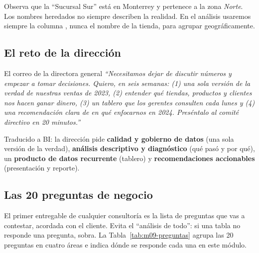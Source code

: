 \begin{advertencia}
Observa que la ``Sucursal Sur'' está en Monterrey y pertenece a la zona
\emph{Norte}. Los nombres heredados no siempre describen la realidad. En el
análisis usaremos siempre la columna , nunca el nombre de la
tienda, para agrupar geográficamente.
\end{advertencia}

\subsection{El reto de la dirección}

\begin{negocio}{El correo de la directora general}
\emph{``Necesitamos dejar de discutir números y empezar a tomar decisiones.
Quiero, en seis semanas: (1) una sola versión de la verdad de nuestras ventas
de 2023, (2) entender qué tiendas, productos y clientes nos hacen ganar
dinero, (3) un tablero que los gerentes consulten cada lunes y (4) una
recomendación clara de en qué enfocarnos en 2024. Preséntalo al comité
directivo en 20 minutos.''}

Traducido a BI: la dirección pide \textbf{calidad y gobierno de datos} (una
sola versión de la verdad), \textbf{análisis descriptivo y diagnóstico}
(qué pasó y por qué), un \textbf{producto de datos recurrente} (tablero) y
\textbf{recomendaciones accionables} (presentación y reporte).
\end{negocio}

\subsection{Las 20 preguntas de negocio}

El primer entregable de cualquier consultoría es la lista de preguntas que
vas a contestar, acordada con el cliente. Evita el ``análisis de todo'': si
una tabla no responde una pregunta, sobra. La
Tabla~\ref{tab:m09-preguntas} agrupa las 20 preguntas en cuatro áreas e
indica dónde se responde cada una en este módulo.

